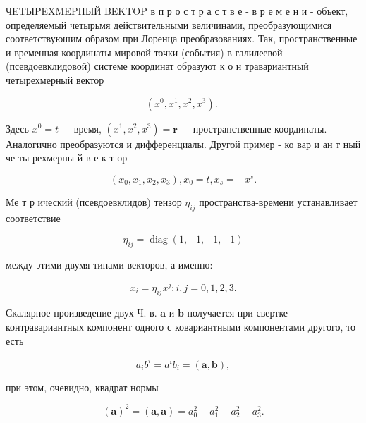 \documentclass[10pt]{article}
\begin{document}
ЧETЫPEXMEPHЫЙ BEKTOP в п р о с т р а с т в е - в р е м е н и - объект, определяемый четырьмя действительными величинами, преобразующимися соответствуюшим образом при Лоренца преобразованиях. Так, пространственные и временная координаты мировой точки (события) в галилеевой (псевдоевклидовой) системе координат образуют к о н травариантный четырехмерный вектор



\[

\left(x^{0}, x^{1}, x^{2}, x^{3}\right) \text {. }

\]



Здесь $x^{0}=t-$ время, $\left(x^{1}, x^{2}, x^{3}\right)=\boldsymbol{r}-$ пространственные координаты. Аналогично преобразуются и дифференциалы. Другой пример - ко вар и ан т ный че ты рехмерны й в е к т ор



\[

\left(x_{0}, x_{1}, x_{2}, x_{3}\right), x_{0}=t, x_{s}=-x^{s} .

\]



Ме т р ический (псевдоевклидов) тензор $\eta_{i j}$ пространства-времени устанавливает соответствие



\[

\eta_{i j}=\operatorname{diag}(1,-1,-1,-1)

\]



между этими двумя типами векторов, а именно:



\[

x_{i}=\eta_{i j} x^{j} ; i, j=0,1,2,3 .

\]



Скалярное произведение двух Ч. в. $\boldsymbol{a}$ и $\boldsymbol{b}$ получается при свертке контравариантных компонент одного с ковариантными компонентами другого, то есть



\[

a_{i} b^{i}=a^{i} b_{i}=(\boldsymbol{a}, \boldsymbol{b}),

\]



при этом, очевидно, квадрат нормы



\[

(\boldsymbol{a})^{2}=(\boldsymbol{a}, \boldsymbol{a})=a_{0}^{2}-a_{1}^{2}-a_{2}^{2}-a_{3}^{2} .

\]
\end{document}
